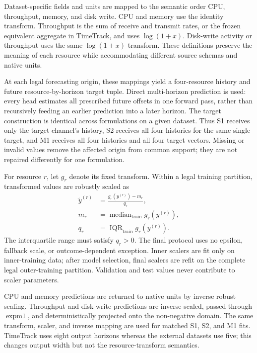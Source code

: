 \documentclass[5p,twocolumn]{elsarticle}
\begin{document}
Dataset-specific fields and units are mapped to the semantic order CPU,
throughput, memory, and disk write.  CPU and memory use the identity transform.
Throughput is the sum of receive and transmit rates, or the frozen equivalent
aggregate in TimeTrack, and uses $\log(1+x)$.  Disk-write activity or throughput
uses the same $\log(1+x)$ transform.  These definitions preserve the meaning of
each resource while accommodating different source schemas and native units.

At each legal forecasting origin, these mappings yield a four-resource history
and future resource-by-horizon target tuple.  Direct multi-horizon prediction is
used: every head estimates all prescribed future offsets in one forward pass,
rather than recursively feeding an earlier prediction into a later horizon.
The target construction is identical across formulations on a given dataset.
Thus S1 receives only the target channel's history, S2 receives all four
histories for the same single target, and M1 receives all four histories and
all four target vectors.  Missing or invalid values remove the affected origin
from common support; they are not repaired differently for one formulation.

For resource $r$, let $g_r$ denote its fixed transform.  Within a legal
training partition, transformed values are robustly scaled as
\begin{equation}
  \begin{aligned}
    \widetilde{y}^{(r)}
      &= \frac{g_r(y^{(r)})-m_r}{q_r}, \\
    m_r &= \operatorname{median}_{\mathrm{train}} g_r(y^{(r)}), \\
    q_r &= \operatorname{IQR}_{\mathrm{train}} g_r(y^{(r)}).
  \end{aligned}
  \label{eq:robust-scaling}
\end{equation}
The interquartile range must satisfy $q_r>0$.  The final protocol uses no
epsilon, fallback scale, or outcome-dependent exception.  Inner scalers are fit
only on inner-training data; after model selection, final scalers are refit on
the complete legal outer-training partition.  Validation and test values never
contribute to scaler parameters.

CPU and memory predictions are returned to native units by inverse robust
scaling.  Throughput and disk-write predictions are inverse-scaled, passed
through $\operatorname{expm1}$, and deterministically projected onto the
non-negative domain.  The same transform, scaler, and inverse mapping are used
for matched S1, S2, and M1 fits.  TimeTrack uses eight output horizons whereas
the external datasets use five; this changes output width but not the
resource-transform semantics.
\end{document}
